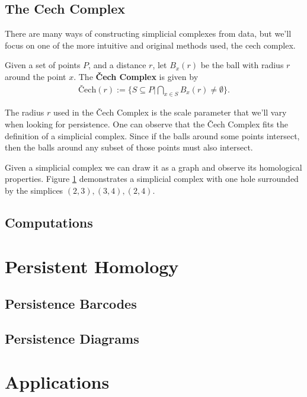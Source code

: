 \subsection{The Cech Complex}\label{sec:cech-complex}

There are many ways of constructing simplicial complexes from data, but we'll focus on one of the more intuitive and original methods used, the cech complex.

\begin{definition}\label{def:cech-complex}
    Given a set of points \(P\), and a distance \(r\), let \(B_x(r)\) be the ball with radius \(r\) around the point \(x\). The \textbf{\v{C}ech Complex} is given by
		\begin{align*}
            \textrm{\v{C}ech}(r) := \{ S \subseteq P | \bigcap_{x\in S} B_x(r) \neq \emptyset \}
            .
		\end{align*}
		\cite{wagner}
\end{definition}


The radius \(r\) used in the \v{C}ech Complex is the scale parameter that we'll vary when looking for persistence. One can observe that the \v{C}ech Complex fits the definition of a simplicial complex.
Since if the balls around some points intersect, then the balls around any subset of those points must also intersect.

Given a simplicial complex we can draw it as a graph and observe its homological properties.
Figure \ref{fig:example-cech} demonstrates a simplicial complex with one hole surrounded by the simplices \((2,3), (3,4), (2,4)\).

\begin{figure}
    
    \caption{}
    \label{fig:example-cech}
\end{figure}

\subsection{Computations}

\section{Persistent Homology}\label{sec:persistent-homology}

\subsection{Persistence Barcodes}

\subsection{Persistence Diagrams}

\section{Applications}\label{sec:applications}

\newpage





